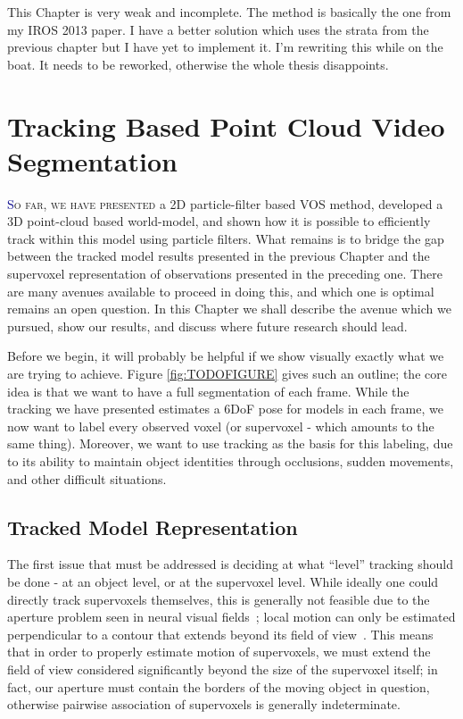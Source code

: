 \begin{savequote}[75mm]
This Chapter is very weak and incomplete. The method is basically the one from my IROS 2013 paper. I have a better solution which uses the strata from the previous chapter but I have yet to implement it. I'm rewriting this while on the boat. It needs to be reworked, otherwise the whole thesis disappoints.
\end{savequote}


\chapter{Tracking Based Point Cloud Video Segmentation}
\label{Chap:TrackingBasedSegmentation}
\lettrine[lines=3, loversize=0.3]{\textcolor{DarkBlue}S}{o far, we have presented} a 2D particle-filter based VOS method, developed a 3D point-cloud based world-model, and shown how it is possible to efficiently track within this model using particle filters. What remains is to bridge the gap between the tracked model results presented in the previous Chapter and the supervoxel representation of observations presented in the preceding one. There are many avenues available to proceed in doing this, and which one is optimal remains an open question. In this Chapter we shall describe the avenue which we pursued, show our results, and discuss where future research should lead.

Before we begin, it will probably be helpful if we show visually exactly what we are trying to achieve. Figure \ref{fig:TODOFIGURE} gives such an outline; the core idea is that we want to have a full segmentation of each frame.  While the tracking we have presented estimates a 6DoF pose for models in each frame, we now want to label every observed voxel (or supervoxel - which amounts to the same thing). Moreover, we want to use tracking as the basis for this labeling, due to its ability to maintain object identities through occlusions, sudden movements, and other difficult situations. 



\section{Tracked Model Representation}
The first issue that must be addressed is deciding at what ``level'' tracking should be done - at an object level, or at the supervoxel level. While ideally one could directly track supervoxels themselves, this is generally not feasible due to the aperture problem seen in neural visual fields~\cite{MarrApertureProblem}; local motion can only be estimated perpendicular to a contour that extends beyond its field of view~\cite{shimojo1989}. This means that in order to properly estimate motion of supervoxels, we must extend the field of view considered significantly beyond the size of the supervoxel itself; in fact, our aperture must contain the borders of the moving object in question, otherwise pairwise association of supervoxels is generally indeterminate. 

